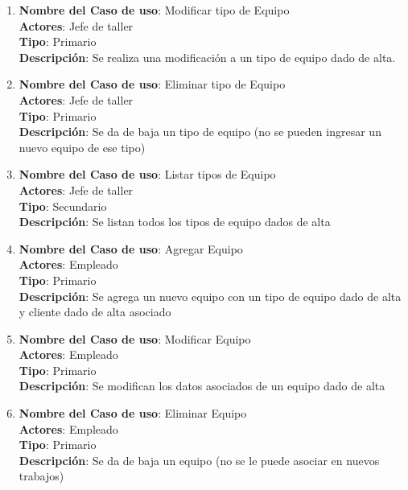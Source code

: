 \documentclass[12pt]{extarticle}
\begin{document}
\begin{spacing}{1.2}
\begin{enumerate}
        \item 	\textbf{Nombre del Caso de uso}: Modificar tipo de Equipo\\
                \textbf{Actores}: Jefe de taller\\
                \textbf{Tipo}: Primario\\
                \textbf{Descripción}: Se realiza una modificación a un tipo de equipo dado de alta.
        
        \item 	\textbf{Nombre del Caso de uso}: Eliminar tipo de Equipo\\
                \textbf{Actores}: Jefe de taller\\
                \textbf{Tipo}: Primario\\
                \textbf{Descripción}: Se da de baja un tipo de equipo (no se pueden ingresar un nuevo equipo de ese tipo)
        
        \item 	\textbf{Nombre del Caso de uso}: Listar tipos de Equipo\\
                \textbf{Actores}: Jefe de taller\\
                \textbf{Tipo}: Secundario\\
                \textbf{Descripción}: Se listan todos los tipos de equipo dados de alta
        
        \item 	\textbf{Nombre del Caso de uso}: Agregar Equipo\\
                \textbf{Actores}: Empleado\\
                \textbf{Tipo}: Primario\\
                \textbf{Descripción}: Se agrega un nuevo equipo con un tipo de equipo dado de alta y cliente dado de alta asociado
        
        \item 	\textbf{Nombre del Caso de uso}: Modificar Equipo\\
                \textbf{Actores}: Empleado\\
                \textbf{Tipo}: Primario\\
                \textbf{Descripción}: Se modifican los datos asociados de un equipo dado de alta
        
        \item 	\textbf{Nombre del Caso de uso}: Eliminar Equipo\\
                \textbf{Actores}: Empleado\\
                \textbf{Tipo}: Primario\\
                \textbf{Descripción}: Se da de baja un equipo (no se le puede asociar en nuevos trabajos)
        

\end{enumerate}
\end{spacing}
\end{document}
